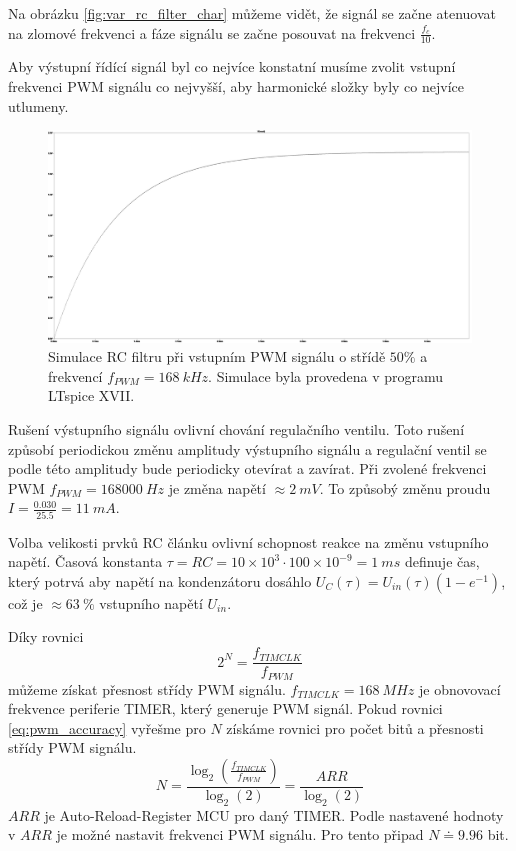 Na obrázku \ref{fig:var_rc_filter_char} můžeme vidět, že signál se začne atenuovat na zlomové frekvenci a fáze signálu se začne posouvat na frekvenci $\frac{f_c}{10}$.  \par

Aby výstupní řídící signál byl co nejvíce konstatní musíme zvolit vstupní frekvenci PWM signálu co nejvyšší, aby harmonické složky byly co nejvíce utlumeny.

\begin{figure}[H]
    \centering
    \includegraphics[width=1\linewidth]{pictures/filtered_pwm.jpg}
    \caption{Simulace RC filtru při vstupním PWM signálu o střídě $50\%$ a frekvencí $f_{PWM} = 168 \ kHz $. Simulace byla provedena v programu LTspice XVII.}
    \label{fig:filtered_pwm}
\end{figure}
Rušení výstupního signálu ovlivní chování regulačního ventilu. Toto rušení způsobí periodickou změnu amplitudy výstupního signálu a regulační ventil se podle této amplitudy bude periodicky otevírat a zavírat. Při zvolené frekvenci PWM $f_{PWM} = 168000 \ Hz $ je změna napětí $\approx 2 \ mV$. To způsobý změnu proudu $I = \frac{0.030}{25.5} = 11 \ mA $. \par
Volba velikosti prvků RC článku ovlivní schopnost reakce na změnu vstupního napětí.
Časová konstanta $\tau = RC = 10 \times 10^{3} \cdot 100 \times 10^{-9}= 1\ ms$ definuje čas, který potrvá aby napětí na kondenzátoru dosáhlo $U_{C}(\tau) = U_{in}(\tau)(1 - e^{-1})$, což je $\approx 63 \ \% $ vstupního napětí $U_{in}$.

\par
Díky rovnici
\begin{equation} \label{eq:pwm_accuracy}
    2^N = \frac{f_{TIMCLK}}{f_{PWM}}
\end{equation}
můžeme získat přesnost střídy PWM signálu. $f_{TIMCLK} = 168 \ MHz$ je obnovovací frekvence periferie TIMER, který generuje PWM signál. Pokud rovnici \ref{eq:pwm_accuracy} vyřešme pro $N$ získáme rovnici pro počet bitů a přesnosti střídy PWM signálu.
\begin{equation}
    N = \frac{\log_{2} (\frac{f_{TIMCLK}}{f_{PWM}})}{\log_{2}(2)} = \frac{ARR}{\log_{2}(2)}
\end{equation}
$ARR$ je Auto-Reload-Register MCU pro daný TIMER. Podle nastavené hodnoty v $ARR$ je možné nastavit frekvenci PWM signálu. Pro tento připad $N \doteq 9.96 $ bit.

